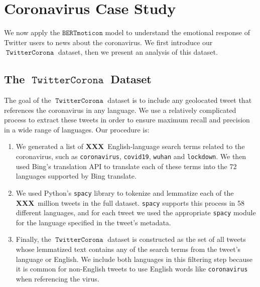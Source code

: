 \documentclass[11pt]{article}
\newcommand{\XXX}{{\textbf{XXX}}~}
\newcommand{\bertmoji}{\texttt{BERTmoticon}}
\DeclareMathOperator{\corona}{\texttt{TwitterCorona}}
\begin{document}

\section{Coronavirus Case Study}
\label{sec:casestudy}

We now apply the $\bertmoji$ model to understand the emotional response of Twitter users to news about the coronavirus.
We first introduce our $\corona$ dataset,
then we present an analysis of this dataset.

\subsection{The $\corona$ Dataset}

The goal of the $\corona$ dataset is to include any geolocated tweet that references the coronavirus in any language.
%
We use a relatively complicated process to extract these tweets in order to ensure maximum recall and precision in a wide range of languages.
Our procedure is:
\begin{enumerate}
\item
We generated a list of \XXX English-language search terms related to the coronavirus,
such as \texttt{coronavirus}, \texttt{covid19}, \texttt{wuhan} and \texttt{lockdown}.
We then used Bing's translation API to translate each of these terms into the 72 languages supported by Bing translate.
\item
We used Python's \texttt{spacy} library \citep{spacy2} to tokenize and lemmatize each of the \XXX million tweets in the full dataset.
\texttt{spacy} supports this process in 58 different languages,
and for each tweet we used the appropriate \texttt{spacy} module for the language specified in the tweet's metadata.
\item
Finally, the $\corona$ dataset is constructed as the set of all tweets whose lemmatized text contains any of the search terms from the tweet's language or English.
We include both languages in this filtering step because it is common for non-English tweets to use English words like \texttt{coronavirus} when referencing the virus.
\end{enumerate}
\end{document}
